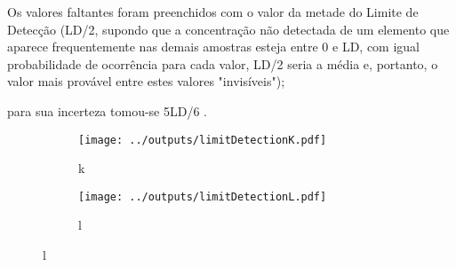 Os valores faltantes foram preenchidos com o valor da metade do Limite de Detecção 
(LD/2, supondo que a concentração não detectada de um elemento que aparece 
frequentemente nas demais amostras esteja entre 0 e LD, com igual 
probabilidade de ocorrência para cada valor, LD/2 seria a média e, portanto, 
o valor mais provável entre estes valores "invisíveis"); 

para sua incerteza tomou-se 5LD/6 \cite{polissar1998}.

\begin{figure}[H]
  \caption{}
  \begin{subfigure}[b]{0.5\textwidth}
    \texttt{[image: ../outputs/limitDetectionK.pdf]}
    \caption{k}
  \end{subfigure}%
  \begin{subfigure}[b]{0.5\textwidth}
    \texttt{[image: ../outputs/limitDetectionL.pdf]}
    \caption{l}
  \end{subfigure}
\end{figure}


